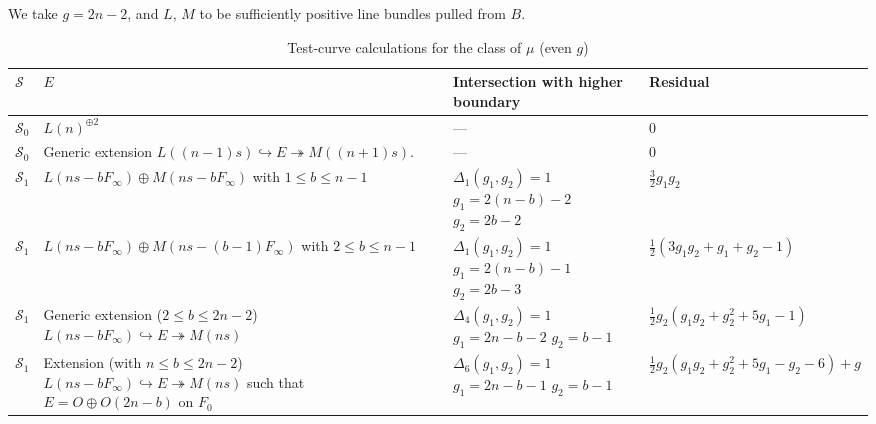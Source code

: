 \documentclass{amsart}
\newcommand{\into}{{\hookrightarrow}}
\newcommand{\onto}{\twoheadrightarrow}
\newcommand{\orb}[1]{{\mathcal #1}}     %
\begin{document}
We take $g = 2n-2$, and $L$, $M$ to be sufficiently positive line bundles pulled from $B$.
\renewcommand{\arraystretch}{2}
\begin{longtable}{| l | p{} | p{} |                     p{} |}
\caption{Test-curve calculations for the class of $\mu$ (even $g$)}\\
\hline
$\orb S$ & $E$ & Intersection with higher boundary& Residual\\
\hline
\endhead
\hline
\endfoot
$\orb S_0$ & $L(n)^{\oplus 2}$& --- & 0\\

$\orb S_0$ & 
Generic extension \newline 
$L((n-1)s) \into E \onto M((n+1)s).$ & 
---&
$0$\\

$\orb S_1$ &
$L(ns - bF_\infty)\oplus M(ns-bF_\infty)$ \newline
with $1 \leq b \leq n-1$ &
$\Delta_1(g_1,g_2) = 1$\newline
$g_1 = 2(n-b)-2$\newline
$g_2 = 2b - 2$ &
$\frac{3}{2}g_1g_2$
\\

$\orb S_1$ &
${L(ns - bF_\infty)}\oplus {M(ns - (b-1)F_\infty)}$\newline
with $2 \leq b \leq n-1$&
$\Delta_1(g_1,g_2) = 1$\newline
$g_1 = 2(n-b)-1$\newline
$g_2 = 2b - 3$ &
$\frac{1}{2} (3g_1g_2+g_1+g_2-1)$
\\

$\orb S_1$ &
Generic extension ($ 2 \leq b \leq 2n-2$)\newline
$L(ns-bF_\infty) \into E \onto M(ns)$&
$\Delta_4(g_1,g_2) = 1$\newline
$g_1 = 2n-b-2$\newline
$g_2 = b-1$&
$\frac{1}{2}g_2(g_1g_2+g_2^2+5g_1-1)$
\\

$\orb S_1$ &
Extension (with $n \leq b \leq 2n-2$)\newline
$L(ns-bF_\infty) \into E \onto M(ns)$ \newline
such that $E = O \oplus O(2n-b)$ on $F_0$&
$\Delta_6(g_1,g_2) = 1$\newline
$g_1 = 2n-b-1$\newline
$g_2 = b-1$&
$\frac{1}{2}g_2(g_1g_2+g_2^2+5g_1-g_2-6) + g$
\\


\end{longtable}
\end{document}
